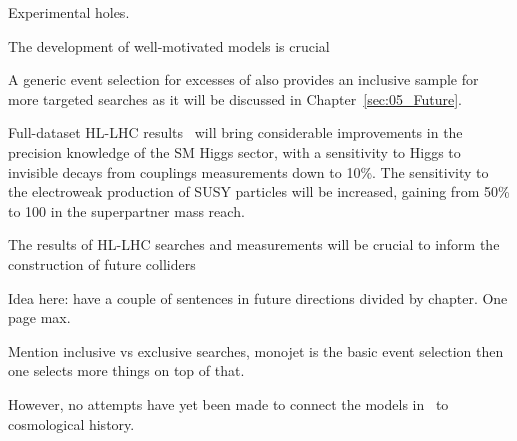 Experimental holes. 


The development of well-motivated models is crucial 

A generic event selection for excesses of \MET also provides an inclusive sample for more targeted searches as it will be discussed in Chapter~\ref{sec:05_Future}. 

Full-dataset HL-LHC results~\cite{Campana:2016cqm} will bring considerable improvements in the precision knowledge of the SM Higgs sector, with a sensitivity to Higgs to invisible decays from couplings measurements down to 10\%. %
The sensitivity to the electroweak production of SUSY particles will be increased, gaining from 50\% to 100\? in the superpartner mass reach. %

The results of HL-LHC searches and measurements will be crucial to inform the construction of future colliders

\cite{Ilten:2016tkc} %
\cite{Golling:2016gvc} %
\cite{Liu:2017zdh} %


Idea here: have a couple of sentences in future directions divided by chapter. One page max. 

Mention inclusive vs exclusive searches, monojet is the basic event selection then one selects more things on top of that. 


However, no attempts have yet been made to connect the models in~\cite{Buchmueller:2017uqu} to cosmological history. 

